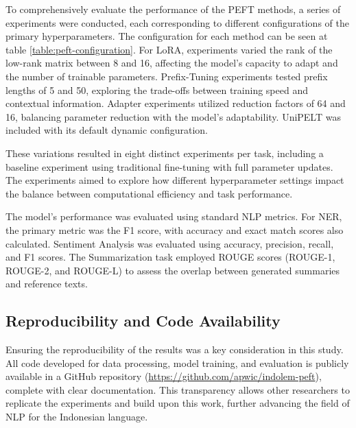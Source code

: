 To comprehensively evaluate the performance of the PEFT methods, a series of experiments were conducted, each corresponding to different configurations of the primary hyperparameters. The configuration for each method can be seen at table \ref{table:peft-configuration}. For LoRA, experiments varied the rank of the low-rank matrix between 8 and 16, affecting the model's capacity to adapt and the number of trainable parameters. Prefix-Tuning experiments tested prefix lengths of 5 and 50, exploring the trade-offs between training speed and contextual information. Adapter experiments utilized reduction factors of 64 and 16, balancing parameter reduction with the model's adaptability. UniPELT was included with its default dynamic configuration.

These variations resulted in eight distinct experiments per task, including a baseline experiment using traditional fine-tuning with full parameter updates. The experiments aimed to explore how different hyperparameter settings impact the balance between computational efficiency and task performance.

The model's performance was evaluated using standard NLP metrics. For NER, the primary metric was the F1 score, with accuracy and exact match scores also calculated. Sentiment Analysis was evaluated using accuracy, precision, recall, and F1 scores. The Summarization task employed ROUGE scores (ROUGE-1, ROUGE-2, and ROUGE-L) to assess the overlap between generated summaries and reference texts.

\subsection{Reproducibility and Code Availability}

Ensuring the reproducibility of the results was a key consideration in this study. All code developed for data processing, model training, and evaluation is publicly available in a GitHub repository (\url{https://github.com/apwic/indolem-peft}), complete with clear documentation. This transparency allows other researchers to replicate the experiments and build upon this work, further advancing the field of NLP for the Indonesian language.

